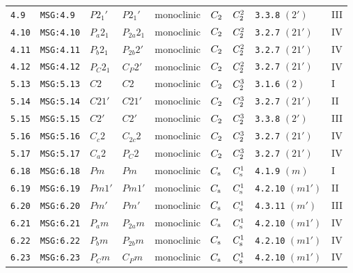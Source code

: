 \documentclass[fleqn,10pt]{jsarticle}
\begin{document}
\begin{center}
\begin{longtable}{lllllllll}
\texttt{4.9} & \texttt{MSG:4.9} & $P2_{1}'$ & $P2_{1}'$ & monoclinic & $C_{\rm 2}$ & $C_{\rm 2}^{2}$ & \texttt{3.3.8} $(2')$ & III \\
\texttt{4.10} & \texttt{MSG:4.10} & $P_{a}2_{1}$ & $P_{2a}2_{1}$ & monoclinic & $C_{\rm 2}$ & $C_{\rm 2}^{2}$ & \texttt{3.2.7} $(21')$ & IV \\
\texttt{4.11} & \texttt{MSG:4.11} & $P_{b}2_{1}$ & $P_{2b}2'$ & monoclinic & $C_{\rm 2}$ & $C_{\rm 2}^{2}$ & \texttt{3.2.7} $(21')$ & IV \\
\texttt{4.12} & \texttt{MSG:4.12} & $P_{C}2_{1}$ & $C_{P}2'$ & monoclinic & $C_{\rm 2}$ & $C_{\rm 2}^{2}$ & \texttt{3.2.7} $(21')$ & IV \\ \hline
\texttt{5.13} & \texttt{MSG:5.13} & $C2$ & $C2$ & monoclinic & $C_{\rm 2}$ & $C_{\rm 2}^{3}$ & \texttt{3.1.6} $(2)$ & I \\
\texttt{5.14} & \texttt{MSG:5.14} & $C21'$ & $C21'$ & monoclinic & $C_{\rm 2}$ & $C_{\rm 2}^{3}$ & \texttt{3.2.7} $(21')$ & II \\
\texttt{5.15} & \texttt{MSG:5.15} & $C2'$ & $C2'$ & monoclinic & $C_{\rm 2}$ & $C_{\rm 2}^{3}$ & \texttt{3.3.8} $(2')$ & III \\
\texttt{5.16} & \texttt{MSG:5.16} & $C_{c}2$ & $C_{2c}2$ & monoclinic & $C_{\rm 2}$ & $C_{\rm 2}^{3}$ & \texttt{3.2.7} $(21')$ & IV \\
\texttt{5.17} & \texttt{MSG:5.17} & $C_{a}2$ & $P_{C}2$ & monoclinic & $C_{\rm 2}$ & $C_{\rm 2}^{3}$ & \texttt{3.2.7} $(21')$ & IV \\ \hline
\texttt{6.18} & \texttt{MSG:6.18} & $Pm$ & $Pm$ & monoclinic & $C_{\rm s}$ & $C_{\rm s}^{1}$ & \texttt{4.1.9} $(m)$ & I \\
\texttt{6.19} & \texttt{MSG:6.19} & $Pm1'$ & $Pm1'$ & monoclinic & $C_{\rm s}$ & $C_{\rm s}^{1}$ & \texttt{4.2.10} $(m1')$ & II \\
\texttt{6.20} & \texttt{MSG:6.20} & $Pm'$ & $Pm'$ & monoclinic & $C_{\rm s}$ & $C_{\rm s}^{1}$ & \texttt{4.3.11} $(m')$ & III \\
\texttt{6.21} & \texttt{MSG:6.21} & $P_{a}m$ & $P_{2a}m$ & monoclinic & $C_{\rm s}$ & $C_{\rm s}^{1}$ & \texttt{4.2.10} $(m1')$ & IV \\
\texttt{6.22} & \texttt{MSG:6.22} & $P_{b}m$ & $P_{2b}m$ & monoclinic & $C_{\rm s}$ & $C_{\rm s}^{1}$ & \texttt{4.2.10} $(m1')$ & IV \\
\texttt{6.23} & \texttt{MSG:6.23} & $P_{C}m$ & $C_{P}m$ & monoclinic & $C_{\rm s}$ & $C_{\rm s}^{1}$ & \texttt{4.2.10} $(m1')$ & IV \\ \hline

\end{longtable}
\end{center}
\end{document}
